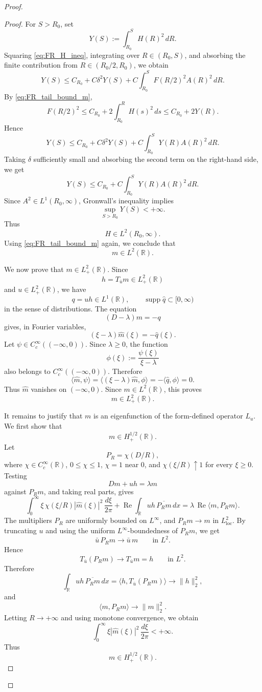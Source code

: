 \documentclass[10pt]{article}
\numberwithin{equation}{section}
\numberwithin{theorem}{section}
\begin{document}
\begin{proof}
\begin{proof}
For \(S>R_0\), set
\[
Y(S):=\int_{R_0}^S H(R)^2\,dR .
\]
Squaring \eqref{eq:FR_H_ineq}, integrating over \(R\in(R_0,S)\), and absorbing
the finite contribution from \(R\in(R_0/2,R_0)\), we obtain
\[
Y(S)
\le
C_{R_0}
+
C\delta^2Y(S)
+
C\int_{R_0}^S F(R/2)^2A(R)^2\,dR .
\]
By \eqref{eq:FR_tail_bound_m},
\[
F(R/2)^2
\le
C_{R_0}
+
2\int_{R_0}^{R}H(s)^2\,ds
\le
C_{R_0}+2Y(R).
\]
Hence
\[
Y(S)
\le
C_{R_0}
+
C\delta^2Y(S)
+
C\int_{R_0}^S Y(R)A(R)^2\,dR .
\]
Taking \(\delta\) sufficiently small and absorbing the second term on the
right-hand side, we get
\[
Y(S)
\le
C_{R_0}
+
C\int_{R_0}^S Y(R)A(R)^2\,dR .
\]
Since \(A^2\in L^1(R_0,\infty)\), Gronwall's inequality implies
\[
\sup_{S>R_0}Y(S)<+\infty .
\]
Thus
\[
H\in L^2(R_0,\infty).
\]
Using \eqref{eq:FR_tail_bound_m} again, we conclude that
\[
m\in L^2(\mathbb R).
\]

We now prove that \(m\in L^2_+(\mathbb R)\). Since
\[
h=T_{\bar u}m\in L^2_+(\mathbb R)
\]
and \(u\in L^2_+(\mathbb R)\), we have
\[
q=uh\in L^1(\mathbb R),
\qquad
\operatorname{supp}\widehat q\subset[0,\infty)
\]
in the sense of distributions. The equation
\[
(D-\lambda)m=-q
\]
gives, in Fourier variables,
\[
(\xi-\lambda)\widehat m(\xi)=-\widehat q(\xi).
\]
Let \(\psi\in C_c^\infty((-\infty,0))\). Since \(\lambda\ge0\), the function
\[
\phi(\xi):=\frac{\psi(\xi)}{\xi-\lambda}
\]
also belongs to \(C_c^\infty((-\infty,0))\). Therefore
\[
\langle \widehat m,\psi\rangle
=
\langle (\xi-\lambda)\widehat m,\phi\rangle
=
-\langle \widehat q,\phi\rangle
=
0.
\]
Thus \(\widehat m\) vanishes on \((-\infty,0)\). Since \(m\in L^2(\mathbb R)\),
this proves
\[
m\in L^2_+(\mathbb R).
\]

It remains to justify that \(m\) is an eigenfunction of the form-defined operator
\(L_u\). We first show that
\[
m\in H^{1/2}_+(\mathbb R).
\]
Let
\[
P_R=\chi(D/R),
\]
where \(\chi\in C_c^\infty(\mathbb R)\), \(0\le\chi\le1\), \(\chi=1\) near
\(0\), and \(\chi(\xi/R)\uparrow1\) for every \(\xi\ge0\). Testing
\[
D m+u h=\lambda m
\]
against \(P_Rm\), and taking real parts, gives
\[
\int_0^\infty
\xi\,\chi(\xi/R)|\widehat m(\xi)|^2\,\frac{d\xi}{2\pi}
+
\operatorname{Re}\int_{\mathbb R}u h\,\overline{P_Rm}\,dx
=
\lambda\,\operatorname{Re}\langle m,P_Rm\rangle .
\]
The multipliers \(P_R\) are uniformly bounded on \(L^\infty\), and
\(P_Rm\to m\) in \(L^2_{\mathrm{loc}}\). By truncating \(u\) and using the
uniform \(L^\infty\)-boundedness of \(P_Rm\), we get
\[
\bar u\,P_Rm\to \bar u\,m
\qquad\text{in }L^2.
\]
Hence
\[
T_{\bar u}(P_Rm)\to T_{\bar u}m=h
\qquad\text{in }L^2.
\]
Therefore
\[
\int_{\mathbb R}u h\,\overline{P_Rm}\,dx
=
\langle h,T_{\bar u}(P_Rm)\rangle
\longrightarrow
\|h\|_2^2,
\]
and
\[
\langle m,P_Rm\rangle\to\|m\|_2^2.
\]
Letting \(R\to+\infty\) and using monotone convergence, we obtain
\[
\int_0^\infty
\xi|\widehat m(\xi)|^2\,\frac{d\xi}{2\pi}<+\infty.
\]
Thus
\[
m\in H^{1/2}_+(\mathbb R).
\]


\end{proof}
\end{proof}
\end{document}
